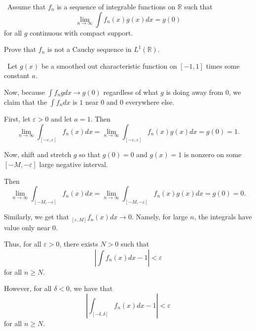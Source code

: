 \documentclass[12pt]{Homework}
\begin{document}
\begin{problem} $\,$
Assume that $f_n$ is a sequence of integrable functions on $\mathbb{R}$ such that $$\lim_{n\to\infty}\int f_n(x)g(x)dx=g(0)$$ for all $g$ continuous with compact support.

Prove that $f_n$ is not a Cauchy sequence in $L^1(\mathbb{R}).$
\end{problem}


\begin{solution}$\,$
Let $g(x)$ be a smoothed out characteristic function on $[-1,1]$ times some constant $a.$

\begin{center}
\end{center}

Now, because $\int f_ngdx\to g(0)$ regardless of what $g$ is doing away from $0$, we claim that the $\int f_ndx$ is $1$ near $0$ and $0$ everywhere else. 

First, let $\varepsilon>0$ and let $a=1$. Then $$\lim_{n\to\infty}\int_{[-\varepsilon,\varepsilon]}f_n(x)dx=\lim_{n\to\infty}\int_{[-\varepsilon,\varepsilon]}f_n(x)g(x)dx=g(0)=1.$$

Now, shift and stretch $g$ so that $g(0)=0$ and $g(x)=1$ is nonzero on some $[-M,-\varepsilon]$ large negative interval.

Then $$\lim_{n\to\infty}\int_{[-M,-\varepsilon]}f_n(x)dx=\lim_{n\to\infty}\int_{[-M,-\varepsilon]}f_n(x)g(x)dx=g(0)=0.$$

Similarly, we get that $\displaystyle_{[\varepsilon,M]}f_n(x)dx\to 0$. Namely, for large $n$, the integrals have value only near $0.$

Thus, for all $\varepsilon>0$, there exists $N>0$ such that $$\left|\int f_n(x)dx-1\right|<\varepsilon$$ for all $n\ge N.$

However, for all $\delta<0$, we have that $$\left|\int_{[-\delta,\delta]} f_n(x)dx-1\right|<\varepsilon$$ for all $n\ge N.$


\end{solution}
\end{document}
